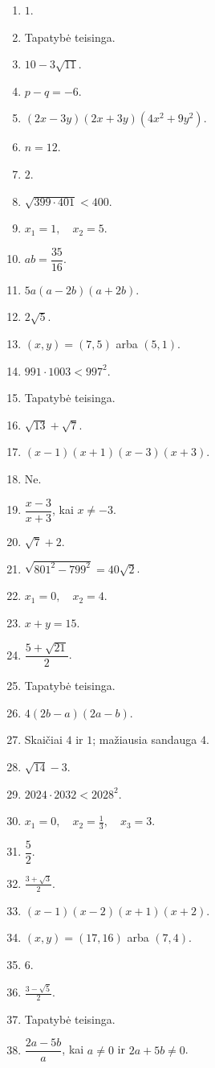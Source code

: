 \documentclass[11pt,a4paper]{article}
\begin{document}
\begin{enumerate}
\item \(1\).
\item Tapatybė teisinga.
\item \(10-3\sqrt{11}\).
\item \(p-q=-6\).
\item \((2x-3y)(2x+3y)(4x^2+9y^2)\).
\item \(n=12\).
\item \(2\).
\item \(\sqrt{399\cdot401}<400\).
\item \(x_1=1,\quad x_2=5\).
\item \(ab=\dfrac{35}{16}\).
\item \(5a(a-2b)(a+2b)\).
\item \(2\sqrt5\).
\item \((x,y)=(7,5)\) arba \((5,1)\).
\item \(991\cdot1003<997^2\).
\item Tapatybė teisinga.
\item \(\sqrt{13}+\sqrt7\).
\item \((x-1)(x+1)(x-3)(x+3)\).
\item Ne.
\item \(\dfrac{x-3}{x+3}\), kai \(x\ne-3\).
\item \(\sqrt7+2\).
\item \(\sqrt{801^2-799^2}=40\sqrt2\).
\item \(x_1=0,\quad x_2=4\).
\item \(x+y=15\).
\item \(\dfrac{5+\sqrt{21}}2\).
\item Tapatybė teisinga.
\item \(4(2b-a)(2a-b)\).
\item Skaičiai \(4\) ir \(1\); mažiausia sandauga \(4\).
\item \(\sqrt{14}-3\).
\item \(2024\cdot2032<2028^2\).
\item \(x_1=0,\quad x_2=\frac13,\quad x_3=3\).
\item \(\dfrac52\).
\item \(\frac{3+\sqrt3}{2}\).
\item \((x-1)(x-2)(x+1)(x+2)\).
\item \((x,y)=(17,16)\) arba \((7,4)\).
\item \(6\).
\item \(\frac{3-\sqrt5}{2}\).
\item Tapatybė teisinga.
\item \(\dfrac{2a-5b}{a}\), kai \(a\ne0\) ir \(2a+5b\ne0\).

\end{enumerate}
\end{document}
